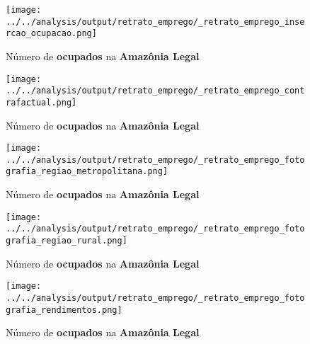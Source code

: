 \documentclass[11pt]{beamer}
\begin{document}
\begin{frame}[label=_retrato_emprego_insercao_ocupacao]{}
\textit{\hyperlink{indice_principal}{}}
\begin{figure}
  \centering
  \texttt{[image: ../../analysis/output/retrato\_emprego/\_retrato\_emprego\_insercao\_ocupacao.png]}
  \label{fig:_retrato_emprego_insercao_ocupacao}
  \caption{{\tiny Número de \textbf{ocupados} na \textbf{Amazônia Legal}}}
\end{figure}
\end{frame}


\begin{frame}[label=_retrato_emprego_contrafactual]{}
\textit{\hyperlink{indice_principal}{}}
\begin{figure}
  \centering
  \texttt{[image: ../../analysis/output/retrato\_emprego/\_retrato\_emprego\_contrafactual.png]}
  \label{fig:_retrato_emprego_contrafactual}
  \caption{{\tiny Número de \textbf{ocupados} na \textbf{Amazônia Legal}}}
\end{figure}
\end{frame}


\begin{frame}[label=_retrato_emprego_fotografia_regiao_metropolitana]{}
\textit{\hyperlink{indice_principal}{}}
\begin{figure}
  \centering
  \texttt{[image: ../../analysis/output/retrato\_emprego/\_retrato\_emprego\_fotografia\_regiao\_metropolitana.png]}
  \label{fig:_retrato_emprego_fotografia_regiao_metropolitana}
  \caption{{\tiny Número de \textbf{ocupados} na \textbf{Amazônia Legal}}}
\end{figure}
\end{frame}

\begin{frame}[label=_retrato_emprego_fotografia_regiao_rural]{}
\textit{\hyperlink{indice_principal}{}}
\begin{figure}
  \centering
  \texttt{[image: ../../analysis/output/retrato\_emprego/\_retrato\_emprego\_fotografia\_regiao\_rural.png]}
  \label{fig:_retrato_emprego_fotografia_regiao_rural}
  \caption{{\tiny Número de \textbf{ocupados} na \textbf{Amazônia Legal}}}
\end{figure}
\end{frame}

\begin{frame}[label=_retrato_emprego_fotografia_rendimentos]{}
\textit{\hyperlink{indice_principal}{}}
\begin{figure}
  \centering
  \texttt{[image: ../../analysis/output/retrato\_emprego/\_retrato\_emprego\_fotografia\_rendimentos.png]}
  \label{fig:_retrato_emprego_fotografia_rendimentos}
  \caption{{\tiny Número de \textbf{ocupados} na \textbf{Amazônia Legal}}}
\end{figure}
\end{frame}
\end{document}
